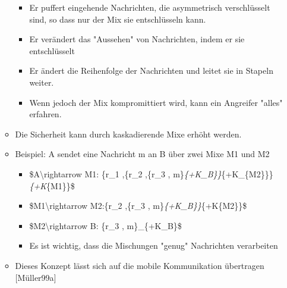 \documentclass[a4paper]{article}
\begin{document}
\begin{multicols}{3}
\begin{itemize}
\begin{itemize}
                        \begin{itemize}
                            \item
                                  Er puffert eingehende Nachrichten, die asymmetrisch verschlüsselt
                                  sind, so dass nur der Mix sie entschlüsseln kann.
                            \item
                                  Er verändert das "Aussehen" von Nachrichten, indem er sie
                                  entschlüsselt
                            \item
                                  Er ändert die Reihenfolge der Nachrichten und leitet sie in
                                  Stapeln weiter.
                            \item
                                  Wenn jedoch der Mix kompromittiert wird, kann ein Angreifer
                                  "alles" erfahren.
                        \end{itemize}
                  \item
                        Die Sicherheit kann durch kaskadierende Mixe erhöht werden.
                  \item
                        Beispiel: A sendet eine Nachricht m an B über zwei Mixe M1 und M2

                        \begin{itemize}
                            \item
                                  \$A\textbackslash rightarrow M1: \{r\_1 ,\{r\_2 ,\{r\_3 ,
                                  m\}\emph{\{+K\_B\}\}}\{+K\_\{M2\}\}\}\emph{\{+K}\{M1\}\}\$
                            \item
                                  \$M1\textbackslash rightarrow M2:\{r\_2 ,\{r\_3 ,
                                  m\}\emph{\{+K\_B\}\}}\{+K\{M2\}\}\$
                            \item
                                  \$M2\textbackslash rightarrow B: \{r\_3 , m\}\_\{+K\_B\}\$
                            \item
                                  Es ist wichtig, dass die Mischungen "genug" Nachrichten
                                  verarbeiten
                        \end{itemize}
                  \item
                        Dieses Konzept lässt sich auf die mobile Kommunikation übertragen
                        {[}Müller99a{]}
              \end{itemize}
    \end{itemize}



\end{multicols}
\end{document}
